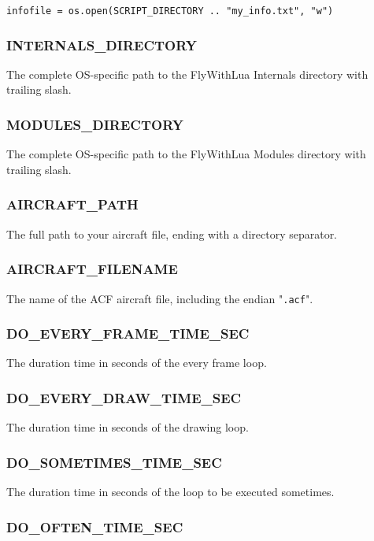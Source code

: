 \documentclass[11pt,parskip=half,a4paper]{scrartcl}
\begin{document}
\verb|infofile = os.open(SCRIPT_DIRECTORY .. "my_info.txt", "w")|

\subsubsection{INTERNALS\_DIRECTORY}

The complete OS-specific path to the FlyWithLua Internals directory with trailing slash.

\subsubsection{MODULES\_DIRECTORY}

The complete OS-specific path to the FlyWithLua Modules directory with trailing slash.

\subsubsection{AIRCRAFT\_PATH}

The full path to your aircraft file, ending with a directory separator.

\subsubsection{AIRCRAFT\_FILENAME}

The name of the ACF aircraft file, including the endian "\verb|.acf|".

\subsubsection{DO\_EVERY\_FRAME\_TIME\_SEC}

The duration time in seconds of the every frame loop.

\subsubsection{DO\_EVERY\_DRAW\_TIME\_SEC}

The duration time in seconds of the drawing loop.

\subsubsection{DO\_SOMETIMES\_TIME\_SEC}

The duration time in seconds of the loop to be executed sometimes.

\subsubsection{DO\_OFTEN\_TIME\_SEC}
\end{document}
